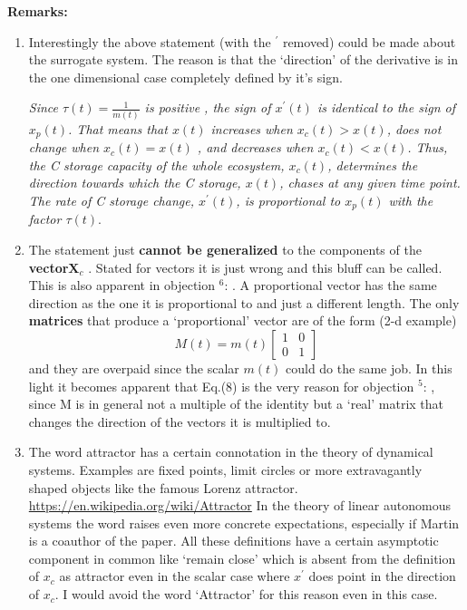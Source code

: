 \documentclass{article}
\newcommand{\om}[1]{{\color{red} objection $^{#1}$}: }
\newcommand{\X}{\mathbf{X}}
\begin{document}
{\bf Remarks:}
\begin{enumerate}
\item
Interestingly the above statement (with the $^{\prime}$ removed) could be made about the surrogate system. The reason is that the `direction' of the derivative is in the one dimensional case completely defined by it's sign. 

{\it 
Since $\tau(t) = \frac{1}{m(t)}$ is positive , the sign of $x^{\prime}(t)$ is
identical to the sign of $x_p(t)$.
That means that $x(t)$ increases when
$x_c(t) > x(t)$, does not change when $x_c(t) = x(t)$ , and decreases when $x_c(t) < x(t)$.
Thus, the C storage capacity of the whole ecosystem, $x_c(t)$, determines the direction towards which the C storage, $x(t)$, chases
at any given time point.
The rate of C storage change, $x^{\prime}(t)$,
is proportional  to $x_p(t)$ with the factor $\tau(t) .$
}
\item
The statement just {\bf cannot be generalized} to the components of the {\bf vector}$\X_c$ . 
Stated for vectors it is just wrong and this bluff can be called.
This is also apparent in \om{6}. A proportional vector has the same direction as the one it is proportional to and just a different length. The only {\bf matrices} that produce a `proportional' vector are of the form (2-d example)
$$
M(t)=
m(t) \left[ 
\begin{matrix} 
  1 & 0 \\ 
  0 & 1 
\end{matrix} 
\right]
$$ 
and they are overpaid since the scalar $m(t)$ could do the same job.
In this light it becomes apparent that Eq.(8) is the very reason for \om{5}, since 
M is in general not a multiple of the identity but a `real' matrix that changes the direction of the vectors it is multiplied to. 

\item
  The word attractor has a certain connotation in the theory of dynamical systems. 
  Examples are fixed points, limit circles or more extravagantly shaped objects like the 
  famous Lorenz attractor. \url{https://en.wikipedia.org/wiki/Attractor}
  In the theory of linear autonomous systems the word raises even more concrete expectations, 
  especially if Martin is a coauthor of the paper.  
  All these definitions have a certain asymptotic component in common like `remain close' which is absent from the definition of $x_c$ as attractor even in the scalar case where $x^{\prime}$ does point in the direction of $x_c$. I would avoid the word `Attractor' for this reason even in this case.   
\end{enumerate}
\end{document}
